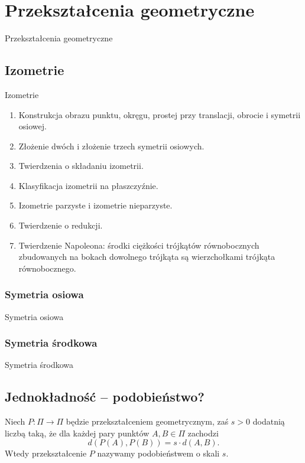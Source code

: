 \section{Przekształcenia geometryczne}
Przekształcenia geometryczne

\subsection{Izometrie}
Izometrie

\begin{enumerate}
    \item Konstrukcja obrazu punktu, okręgu, prostej przy translacji, obrocie i symetrii osiowej.
    \item Złożenie dwóch i złożenie trzech symetrii osiowych.
    \item Twierdzenia o składaniu izometrii.
    \item Klasyfikacja izometrii na płaszczyźnie.
    \item Izometrie parzyste i izometrie nieparzyste.
    \item Twierdzenie o redukcji.
    \item Twierdzenie Napoleona: środki ciężkości trójkątów równobocznych zbudowanych na bokach dowolnego trójkąta są wierzchołkami trójkąta równobocznego.
\end{enumerate}

\subsubsection{Symetria osiowa}
Symetria osiowa

\subsubsection{Symetria środkowa}
Symetria środkowa

\subsection{Jednokładność -- podobieństwo?}

\begin{definition}[podobieństwo]
    Niech $P \colon \Pi \to \Pi$ będzie przekształceniem geometrycznym, zaś $s > 0$ dodatnią liczbą taką, że dla każdej pary punktów $A, B \in \Pi$ zachodzi
    \begin{equation}
        d(P(A), P(B)) = s \cdot d(A, B).
    \end{equation}
    Wtedy przekształcenie $P$ nazywamy podobieństwem o skali $s$.
\end{definition}

